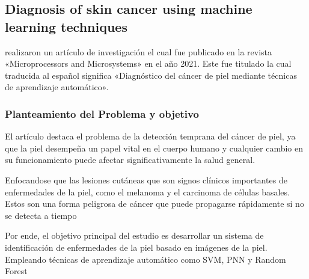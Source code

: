 \subsection{Diagnosis of skin cancer using machine learning techniques \citep*{murugan_2021diagnosis}}

\citeauthor{murugan_2021diagnosis} realizaron un artículo de investigación el cual fue publicado en la revista «Microprocessors and Microsystems» en el año 2021. Este fue titulado  la cual traducida al español significa «Diagnóstico del cáncer de piel mediante técnicas de aprendizaje automático».



\subsubsection{Planteamiento del Problema y objetivo}
 El artículo destaca el problema de la detección temprana del cáncer de piel, ya que la piel desempeña un papel vital en el cuerpo humano y cualquier cambio en su funcionamiento puede afectar significativamente la salud general.

Enfocandose que las lesiones cutáneas que son signos clínicos importantes de enfermedades de la piel, como el melanoma y el carcinoma de células basales. Estos son una forma peligrosa de cáncer que puede propagarse rápidamente si no se detecta a tiempo

Por ende, el objetivo principal del estudio es desarrollar un sistema de identificación de enfermedades de la piel basado en imágenes de la piel. Empleando técnicas de aprendizaje automático como SVM, PNN y Random Forest

